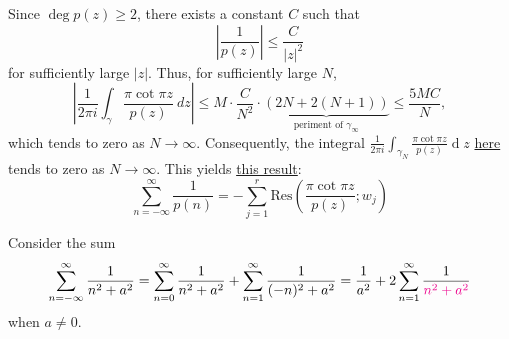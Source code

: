 \documentclass[12pt]{article}
\renewcommand{\d}{\ensuremath{\operatorname{d}}}
\begin{document}
Since $\deg p(z)\geq2$, there exists a constant $C$ such that
$$\left|\frac{1}{p(z)}\right|\leq\frac{C}{|z|^{2}}$$
for sufficiently large $|z|$. Thus, for sufficiently large $N$,
$$\left|\frac{1}{2\pi i}\int_{\gamma}\frac{\pi\cot\pi z}{p(z)}\ dz\right|\leq M\cdot\frac{C}{N^{2}}\cdot\underbrace{(2N+2(N+1))}_{\text{periment of $\gamma_{\infty}$}}\leq\frac{5MC}{N},$$
which tends to zero as $N\to\infty$. Consequently, the integral ${\frac{1}{2\pi i}}\int_{\gamma_{N}}{\frac{\pi\cot\pi z}{p(z)}}\d z$ \hyperlink{cotangent-integral}{here} tends to zero as $N\to\infty$. This yields \hyperlink{integral-of-1-over-pn}{this result}:\[\sum_{n=-\infty}^{\infty}{\frac{1}{p(n)}}=-\sum_{j=1}^{r}\mathrm{Res}\left({\frac{\pi\cot\pi z}{p(z)}};w_{j}\right)\]

\eg Consider the sum \[\sum_{n=-\infty}^{\infty}\frac{1}{n^2+a^2} = \sum_{n=0}^{\infty}\frac{1}{n^2+a^2}+\sum_{n=1}^{\infty}\frac{1}{(-n)^2+a^2}= \frac{1}{a^2} +2\sum_{n=1}^{\infty}\frac{1}{\textcolor{magenta}{n^2+a^2}}\] when $a\neq 0$.
\end{document}
